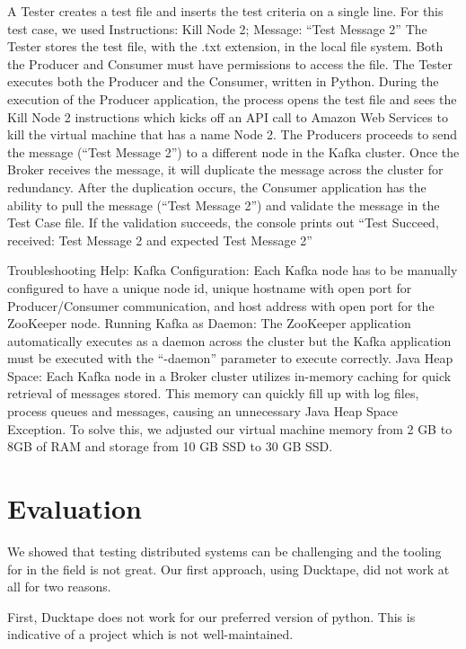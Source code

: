 \begin{multicols}{2}
A Tester creates a test file and inserts the test criteria on a single line.
For this test case, we used Instructions: Kill Node 2; Message: “Test Message 2”
The Tester stores the test file, with the .txt extension, in the local file system.
Both the Producer and Consumer must have permissions to access the file.
The Tester executes both the Producer and the Consumer, written in Python.
During the execution of the Producer application, the process opens the test file and sees the Kill Node 2 instructions which kicks off an API call to Amazon Web Services to kill the virtual machine that has a name Node 2.
The Producers proceeds to send the message (“Test Message 2”) to a different node in the Kafka cluster.
Once the Broker receives the message, it will duplicate the message across the cluster for redundancy.
After the duplication occurs, the Consumer application has the ability to pull the message (“Test Message 2”) and validate the message in the Test Case file.
If the validation succeeds, the console prints out “Test Succeed, received: Test Message 2 and expected Test Message 2”

Troubleshooting Help:
Kafka Configuration: Each Kafka node has to be manually configured to have a unique node id, unique hostname with open port for Producer/Consumer communication, and host address with open port for the ZooKeeper node.
Running Kafka as Daemon: The ZooKeeper application automatically executes as a daemon across the cluster but the Kafka application must be executed with the “-daemon” parameter to execute correctly.
Java Heap Space: Each Kafka node in a Broker cluster utilizes in-memory caching for quick retrieval of messages stored.
This memory can quickly fill up with log files, process queues and messages, causing an unnecessary Java Heap Space Exception.
To solve this, we adjusted our virtual machine memory from 2 GB to 8GB of RAM and storage from 10 GB SSD to 30 GB SSD.


\section{Evaluation}

We showed that testing distributed systems can be challenging and the tooling for in the field is not great.
Our first approach, using Ducktape, did not work at all for two reasons.

First, Ducktape does not work for our preferred version of python.
This is indicative of a project which is not well-maintained.


\end{multicols}
